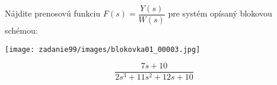 \documentclass{article}
\begin{document}
\begin{task}

    Nájdite prenosovú funkciu $F(s)=\dfrac{Y(s)}{W(s)}$ pre systém opísaný blokovou schémou: 

    \texttt{[image: zadanie99/images/blokovka01\_00003.jpg]} 

\end{task}
\begin{equation*}

        \dfrac{7s+10}{2s^3+11s^2+12s+10}
    
\end{equation*}
\end{document}
